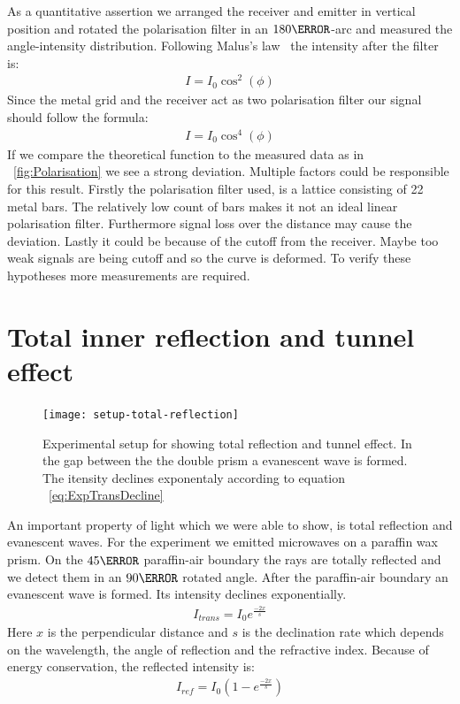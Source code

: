 \documentclass[a4paper,10pt,twocolumn]{article}
\begin{document}
    As a quantitative assertion we arranged the receiver and emitter in vertical position and rotated the polarisation
    filter in an $ 180\degree $-arc and measured the angle-intensity distribution.
    Following Malus's law~\cite{gerth} the intensity after the filter is:
    \begin{align}
        I = I_0 \cos^2(\phi)
    \end{align}
    Since the metal grid and the receiver act as two polarisation filter our signal should follow the formula:
    \begin{align}
        \label{eq:cos4}
        I = I_0 \cos^4( \phi )
    \end{align}
    If we compare the theoretical function to the measured data as in ~\ref{fig:Polarisation} we see a strong deviation.
    Multiple factors could be responsible for this result.
    Firstly the polarisation filter used, is a lattice consisting of 22 metal bars. 
    The relatively low count of bars makes it not an ideal linear polarisation filter.
    Furthermore signal loss over the distance may cause the deviation.
    Lastly it could be because of the cutoff from the receiver.
    Maybe too weak signals are being cutoff and so the curve is deformed.
    To verify these hypotheses more measurements are required.
    
    
    \section{Total inner reflection and tunnel effect}
    
    \begin{figure}[htbp]
        \texttt{[image: setup-total-reflection]}
        \centering
        \caption{Experimental setup for showing total reflection and tunnel effect.
        In the gap between the the double prism a evanescent wave is formed.
        The itensity declines exponentaly according to equation ~\eqref{eq:ExpTransDecline}}
        \label{fig:SetupTotalReflection}
    \end{figure}
    An important property of light which we were able to show, is total reflection and evanescent waves.
    For the experiment we emitted microwaves on a paraffin wax prism. 
    On the $45\degree$ paraffin-air boundary the rays are totally reflected and we detect them in an $90\degree$ rotated
    angle. 
    After the paraffin-air boundary an evanescent wave is formed.
    Its intensity declines exponentially.
    \begin{align}
        \label{eq:ExpTransDecline}
        I_{trans} = I_0 e^{\frac{-2x}{s}} 
    \end{align}
    Here $x$ is the perpendicular distance and $s$ is the declination rate which depends on the wavelength, 
    the angle of reflection and the refractive index.
    Because of energy conservation, the reflected intensity is:
    \begin{align*}
        I_{ref} = I_0 (1 - e^{\frac{-2x}{s}})
    \end{align*}
    
\end{document}
